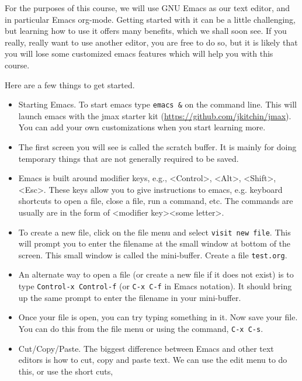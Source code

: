 \documentclass[11pt]{article}
\begin{document}
For the purposes of this course, we will use GNU Emacs as our text editor, and in particular Emacs org-mode. Getting started with it can be a little challenging, but learning how to use it offers many benefits, which we shall soon see. If you really, really want to use another editor, you are free to do so, but it is likely that you will lose some customized emacs features which will help you with this course.

Here are a few things to get started.

\begin{itemize}
\item Starting Emacs. To start emacs type \verb~emacs &~ on the command line. This will launch emacs with the jmax starter kit (\url{https://github.com/jkitchin/jmax}). You can add your own customizations when you start learning more.

\item The first screen you will see is called the scratch buffer. It is mainly for doing temporary things that are not generally required to be saved.

\item Emacs is built around modifier keys, e.g., <Control>, <Alt>, <Shift>, <Esc>. These keys allow you to give instructions to emacs, e.g. keyboard shortcuts to open a file, close a file, run a command, etc. The commands are usually are in the form of <modifier key><some letter>.

\item To create a new file, click on the file menu and select \texttt{visit new file}. This will prompt you to enter the filename at the small window at bottom of the screen. This small window is called the mini-buffer. Create a file \texttt{test.org}.

\item An alternate way to open a file (or create a new file if it does not exist) is to type \verb~Control-x Control-f~ (or \verb~C-x C-f~ in Emacs notation). It should bring up the same prompt to enter the filename in your mini-buffer.

\item Once your file is open, you can try typing something in it. Now save your file. You can do this from the file menu or using the command, \verb~C-x C-s~.

\item Cut/Copy/Paste. The biggest difference between Emacs and other text editors is how to cut, copy and paste text. We can use the edit menu to do this, or use the short cuts,


\end{itemize}
\end{document}
